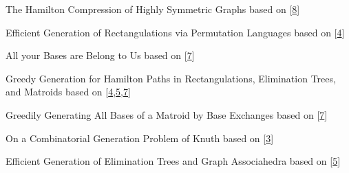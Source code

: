 \begin{cvtalks}
{  }
  \cvtalk
  {The Hamilton Compression of Highly Symmetric Graphs}
  {based on [\hyperlink{paper8}{8}]}
  {
    \begin{cvitems}
      \item {} \hfill {} 
    \end{cvitems}
  }
  \cvtalk
  {Efficient Generation of Rectangulations via Permutation Languages}
  {based on [\hyperlink{paper4}{4}]}
  {
    \begin{cvitems}
      \item {} \hfill {}
    \end{cvitems}
  }
  \cvtalk
  {All your Bases are Belong to Us}
  {based on [\hyperlink{paper7}{7}]}
  {
    \begin{cvitems}
      \item {} \hfill {} 
    \end{cvitems}
  }
  \cvtalk
  {Greedy Generation for Hamilton Paths in Rectangulations, Elimination Trees, and Matroids}
  {based on [\hyperlink{paper4}{4},\hyperlink{paper5}{5},\hyperlink{paper7}{7}]}
  {
    \begin{cvitems}
      \item {} \hfill {}
    \end{cvitems}
  }
  \cvtalk
  {Greedily Generating All Bases of a Matroid by Base Exchanges}
  {based on [\hyperlink{paper7}{7}]}
  {
    \begin{cvitems}
      \item {} \hfill {}
    \end{cvitems}
  }
  \cvtalk
  {On a Combinatorial Generation Problem of Knuth}
  {based on [\hyperlink{paper3}{3}]}
  {
    \begin{cvitems}
      \item {} \hfill {} 
    \end{cvitems}
  }
  \cvtalk
  {Efficient Generation of Elimination Trees and Graph Associahedra}
  {based on [\hyperlink{paper5}{5}]}
  {
    \begin{cvitems}
      \item {} \hfill {}

\end{cvitems}}
\end{cvtalks}
